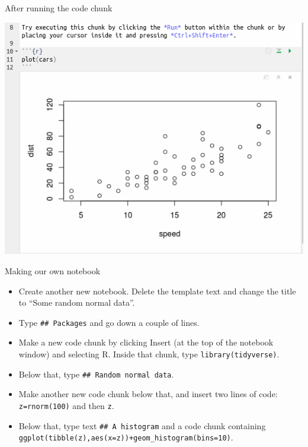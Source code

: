 \documentclass[ignorenonframetext,]{beamer}
\providecommand{\tightlist}{%
  \setlength{\itemsep}{0pt}\setlength{\parskip}{0pt}}
\begin{document}
\begin{frame}{After running the code chunk}
\protect\hypertarget{after-running-the-code-chunk}{}

\includegraphics{Screenshot_2018-06-29_16-49-00.png}

\end{frame}

\begin{frame}[fragile]{Making our own notebook}
\protect\hypertarget{making-our-own-notebook}{}

\begin{itemize}
\tightlist
\item
  Create another new notebook. Delete the template text and change the
  title to ``Some random normal data''.
\item
  Type \texttt{\#\#\ Packages} and go down a couple of lines.
\item
  Make a new code chunk by clicking Insert (at the top of the notebook
  window) and selecting R. Inside that chunk, type
  \texttt{library(tidyverse)}.
\item
  Below that, type \texttt{\#\#\ Random\ normal\ data}.
\item
  Make another new code chunk below that, and insert two lines of code:
  \texttt{z=rnorm(100)} and then \texttt{z}.
\item
  Below that, type text \texttt{\#\#\ A\ histogram} and a code chunk
  containing
  \texttt{ggplot(tibble(z),aes(x=z))+geom\_histogram(bins=10)}.
\end{itemize}

\end{frame}
\end{document}

